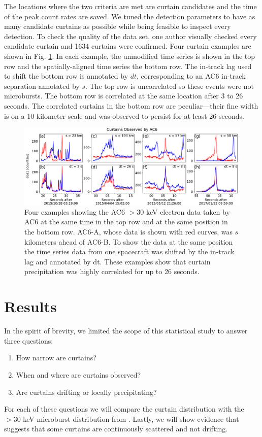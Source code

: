 \documentclass[draft]{agujournal2019}
\begin{document}
The locations where the two criteria are met are curtain candidates and the time of the peak count rates are saved. We tuned the detection parameters to have as many candidate curtains as possible while being feasible to inspect every detection. To check the quality of the data set, one author visually checked every candidate curtain and 1634 curtains were confirmed. Four curtain examples are shown in Fig. \ref{fig1}. In each example, the unmodified time series is shown in the top row and the spatially-aligned time series the bottom row. The in-track lag used to shift the bottom row is annotated by $dt$, corresponding to an AC6 in-track separation annotated by $s$. The top row is uncorrelated so these events were not microbursts. The bottom row is correlated at the same location after 3 to 26 seconds. The correlated curtains in the bottom row are peculiar---their fine width is on a 10-kilometer scale and was observed to persist for at least 26 seconds.

\begin{figure}
\includegraphics[width=\textwidth]{fig1.pdf}
\caption{Four examples showing the AC6 $> 30$ keV electron data taken by AC6 at the same time in the top row and at the same position in the bottom row. AC6-A, whose data is shown with red curves, was $s$ kilometers ahead of AC6-B. To show the data at the same position the time series data from one spacecraft was shifted by the in-track lag and annotated by dt. These examples show that curtain precipitation was highly correlated for up to 26 seconds.}
\label{fig1}
\end{figure}

\section{Results} \label{results}
In the spirit of brevity, we limited the scope of this statistical study to answer three questions:

\begin{enumerate}
\item How narrow are curtains?
\item When and where are curtains observed?
\item Are curtains drifting or locally precipitating?
\end{enumerate} For each of these questions we will compare the curtain distribution with the $>30$ keV microburst distribution from . Lastly, we will show evidence that suggests that some curtains are continuously scattered and not drifting.
\end{document}
